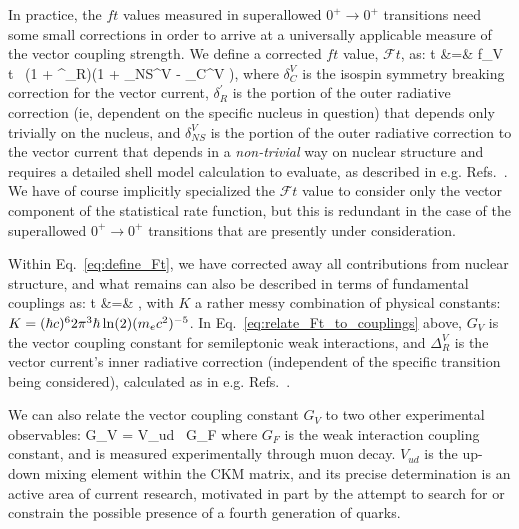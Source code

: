 In practice, the $ft$ values measured in superallowed $0^+ \rightarrow 0^+$ transitions need some small corrections in order to arrive at a universally applicable measure of the vector coupling strength.  We define a corrected $ft$ value, $\mathcal{F}t$, as:
\bea
{}t &=& f_V t \, (1 + \delta^\prime_R)(1 + \delta_{NS}^V - \delta_C^{V} ),
\label{eq:define_Ft}
\eea
where 
$\delta_C^{V}$ is the isospin symmetry breaking correction for the vector current, 
$\delta^\prime_R$ is the portion of the outer radiative correction (ie, dependent on the specific nucleus in question) that depends only trivially on the nucleus, 
and
$\delta_{NS}^{V}$ is the portion of the outer radiative correction %
to the vector current that depends in a \emph{non-trivial} way on nuclear structure and requires a detailed shell model calculation to evaluate, as described in e.g.  Refs.~\cite{TownerHardy2008}\cite{JausRasche1990}\cite{barker1992}\cite{Towner1992}\cite{Towner1994}.  We have of course implicitly specialized the $\mathcal{F}t$ value to consider only the vector component of the statistical rate function, but this is redundant in the case of the superallowed $0^+ \rightarrow 0^+$ transitions that are presently under consideration.

Within Eq.~\ref{eq:define_Ft}, we have corrected away all contributions from nuclear structure, and what remains can also be described in terms of fundamental couplings as:
\bea
{}t &=& ,
\label{eq:relate_Ft_to_couplings}
\eea
with $K$ a rather messy combination of physical constants: $K = (\hbar c)^6 2\pi^3 \hbar \ln(2) (m_e c^2)^{-5}$.  In Eq.~\ref{eq:relate_Ft_to_couplings} above, $G_V$ is the vector coupling constant for semileptonic weak interactions, and $\Delta_R^{V}$ is the vector current's inner radiative correction (independent of the specific transition being considered), calculated as in e.g. Refs.~\cite{MarcianoSirlin_1986}\cite{MarcianoSirlin_2006}\cite{CzarneckiMarcianoSirlin_2019}.  %

We can also relate the vector coupling constant $G_V$ to two other experimental observables:
\bea
G_V = V_{ud}  \, G_F
\label{eq:Vud_relate}
\eea
where $G_F$ is the weak interaction coupling constant, and is measured experimentally through muon decay.  $V_{ud}$ is the up-down mixing element within the \ac{CKM} matrix, and its precise determination is an active area of current research, motivated in part by the attempt to search for or constrain the possible presence of a fourth generation of quarks.

